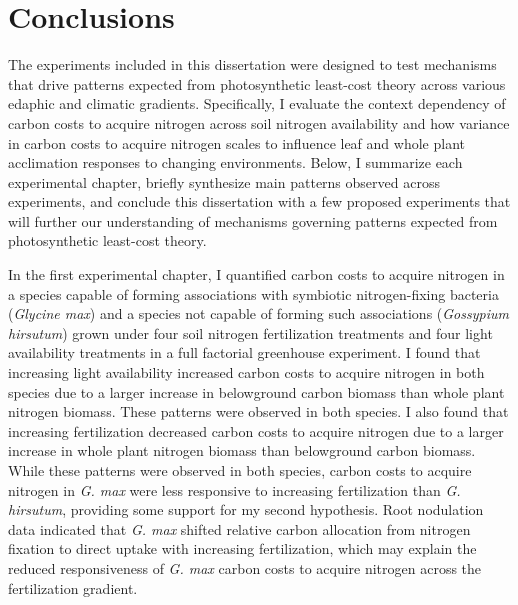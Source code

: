 \chapter{\textbf{Conclusions}}
\noindent The experiments included in this dissertation were designed to test mechanisms that drive patterns expected from photosynthetic least-cost theory across various edaphic and climatic gradients. Specifically, I evaluate the context dependency of carbon costs to acquire nitrogen across soil nitrogen availability and how variance in carbon costs to acquire nitrogen scales to influence leaf and whole plant acclimation responses to changing environments. Below, I summarize each experimental chapter, briefly synthesize main patterns observed across experiments, and conclude this dissertation with a few proposed experiments that will further our understanding of mechanisms governing patterns expected from photosynthetic least-cost theory.

In the first experimental chapter, I quantified carbon costs to acquire nitrogen in a species capable of forming associations with symbiotic nitrogen-fixing bacteria (\textit{Glycine max}) and a species not capable of forming such associations (\textit{Gossypium hirsutum}) grown under four soil nitrogen fertilization treatments and four light availability treatments in a full factorial greenhouse experiment. I found that increasing light availability increased carbon costs to acquire nitrogen in both species due to a larger increase in belowground carbon biomass than whole plant nitrogen biomass. These patterns were observed in both species. I also found that increasing fertilization decreased carbon costs to acquire nitrogen due to a larger increase in whole plant nitrogen biomass than belowground carbon biomass. While these patterns were observed in both species, carbon costs to acquire nitrogen in \textit{G. max} were less responsive to increasing fertilization than \textit{G. hirsutum}, providing some support for my second hypothesis. Root nodulation data indicated that \textit{G. max} shifted relative carbon allocation from nitrogen fixation to direct uptake with increasing fertilization, which may explain the reduced responsiveness of \textit{G. max} carbon costs to acquire nitrogen across the fertilization gradient. 

